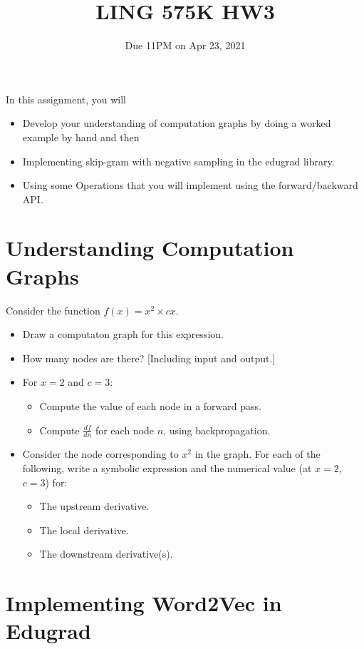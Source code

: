 \documentclass[11pt]{article}
\begin{document}
\title{LING 575K HW3}
\date{\vspace{-0.2in}Due 11PM on Apr 23, 2021}
\maketitle


\noindent In this assignment, you will 
\begin{itemize}
  \item Develop your understanding of computation graphs by doing a worked example by hand and then
  \item Implementing skip-gram with negative sampling in the edugrad library.
  \item Using some Operations that you will implement using the forward/backward API.
\end{itemize}


\section{Understanding Computation Graphs}

  Consider the function $f(x) = x^2 \times cx$.
\begin{itemize}
  \item Draw a computaton graph for this expression.
  \item How many nodes are there?  [Including input and output.]
  \item For $x = 2$ and $c=3$:
    \begin{itemize}
      \item Compute the value of each node in a forward pass.
      \item Compute $\frac{df}{dn}$ for each node $n$, using backpropagation.
    \end{itemize}
  \item Consider the node corresponding to $x^2$ in the graph.  For each of the following, write a symbolic expression and the numerical value (at $x=2$, $c=3$) for:
    \begin{itemize}
      \item The upstream derivative.
      \item The local derivative.
      \item The downstream derivative(s).
    \end{itemize}
\end{itemize}

\section{Implementing Word2Vec in Edugrad}
\end{document}

